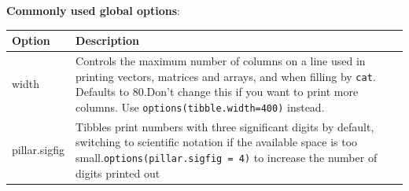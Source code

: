 \documentclass[
  a4paper,
  twoside,
  openright]{book}
\newenvironment{Shaded}{\begin{snugshade}}{\end{snugshade}}
\newcommand{\AttributeTok}[1]{\textcolor[rgb]{0.13,0.29,0.53}{#1}}
\newcommand{\CommentTok}[1]{\textcolor[rgb]{0.56,0.35,0.01}{\textit{#1}}}
\newcommand{\DecValTok}[1]{\textcolor[rgb]{0.00,0.00,0.81}{#1}}
\newcommand{\DocumentationTok}[1]{\textcolor[rgb]{0.56,0.35,0.01}{\textbf{\textit{#1}}}}
\newcommand{\FunctionTok}[1]{\textcolor[rgb]{0.13,0.29,0.53}{\textbf{#1}}}
\newcommand{\NormalTok}[1]{#1}
\newcommand{\SpecialCharTok}[1]{\textcolor[rgb]{0.81,0.36,0.00}{\textbf{#1}}}
\newcommand{\StringTok}[1]{\textcolor[rgb]{0.31,0.60,0.02}{#1}}
\theoremstyle{definition}
\theoremstyle{definition}
\theoremstyle{definition}
\theoremstyle{definition}
\theoremstyle{remark}
\begin{document}
\begin{Shaded}
\end{Shaded}

\textbf{Commonly used global options}:

\begin{longtable}[]{@{}
  >{\raggedright\arraybackslash}p{}
  >{\raggedright\arraybackslash}p{}@{}}
\toprule\noalign{}
\begin{minipage}[b]{\linewidth}\raggedright
Option
\end{minipage} & \begin{minipage}[b]{\linewidth}\raggedright
Description
\end{minipage} \\
\midrule\noalign{}
\endhead
\bottomrule\noalign{}
\endlastfoot
width & Controls the maximum number of columns on a line used in printing vectors, matrices and arrays, and when filling by \texttt{cat}. Defaults to 80.Don't change this if you want to print more columns. Use {\texttt{options(tibble.width=400)}} instead. \\
pillar.sigfig & Tibbles print numbers with three significant digits by default, switching to scientific notation if the available space is too small.\texttt{options(pillar.sigfig\ =\ 4)} to increase the number of digits printed out \\
\end{longtable}
\end{document}
